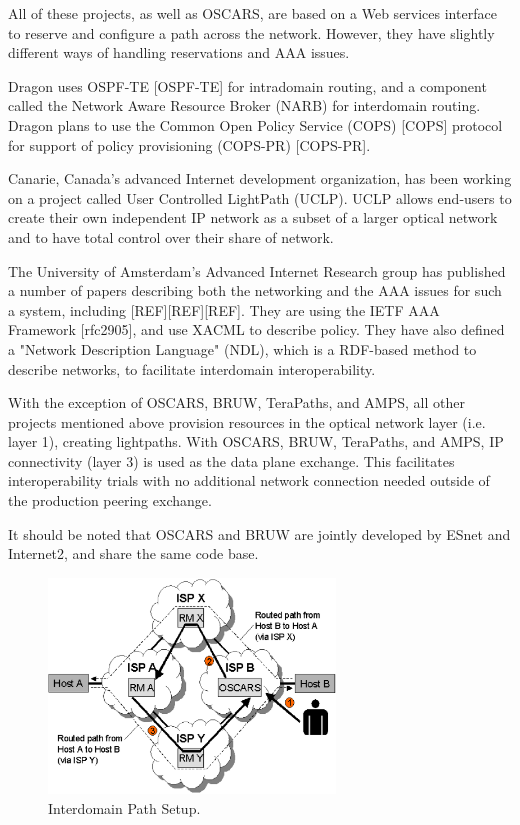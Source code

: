 \documentclass[conference]{IEEEtran}
\begin{document}
All of these projects, as well as OSCARS, are based on a Web services 
interface to reserve and configure a path across the network. However, they 
have slightly different ways of handling reservations and AAA issues.

Dragon uses OSPF-TE [OSPF-TE] for intradomain routing, and a component called
the Network Aware Resource Broker (NARB) for interdomain routing.
Dragon plans to use the Common Open Policy Service (COPS) [COPS]
protocol for support of policy provisioning (COPS-PR) [COPS-PR].

Canarie, Canada's advanced Internet development organization, has been
working on a project called User Controlled LightPath (UCLP).  UCLP
allows end-users to create their own independent IP network as a subset
of a larger optical network and to have total control over their share
of network.

The University of Amsterdam's Advanced Internet Research group has
published a number of papers
describing both the networking and the AAA issues for such a system,
including [REF][REF][REF]. They are using the IETF AAA Framework
[rfc2905], and use XACML to describe policy. They have also defined a
"Network Description Language" (NDL), which is a RDF-based method to
describe networks, to facilitate interdomain interoperability.

With the exception of OSCARS, BRUW,
TeraPaths, and AMPS, all other projects mentioned above provision resources
in the optical network layer (i.e. layer 1), creating lightpaths.
With OSCARS, BRUW, TeraPaths, and AMPS, IP connectivity (layer
3) is used as the data plane exchange.  This facilitates interoperability
trials with no additional network connection needed outside of the production
peering exchange.

It should be noted that OSCARS and BRUW are jointly developed by ESnet and 
Internet2, and share the same code base.

\begin{figure}
 \centering 
   \includegraphics[width=3in]{pict2.eps}
   \caption{Interdomain Path Setup.}
 \label{fig:interdomain_path_setup}
\end{figure}
\end{document}
